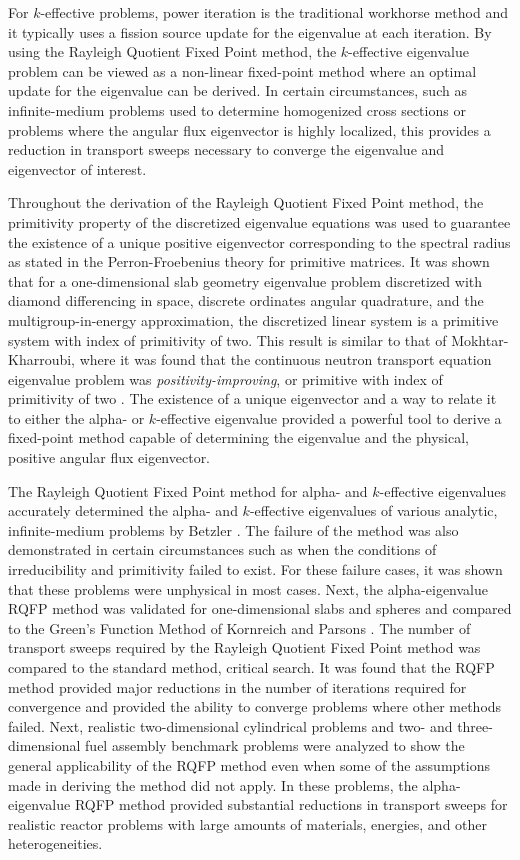 For $k$-effective problems, power iteration is the traditional workhorse method and it typically uses a fission source update for the eigenvalue at each iteration. By using the Rayleigh Quotient Fixed Point method, the $k$-effective eigenvalue problem can be viewed as a non-linear fixed-point method where an optimal update for the eigenvalue can be derived. In certain circumstances, such as infinite-medium problems used to determine homogenized cross sections or problems where the angular flux eigenvector is highly localized, this provides a reduction in transport sweeps necessary to converge the eigenvalue and eigenvector of interest.

Throughout the derivation of the Rayleigh Quotient Fixed Point method, the primitivity property of the discretized eigenvalue equations was used to guarantee the existence of a unique positive eigenvector corresponding to the spectral radius as stated in the Perron-Froebenius theory for primitive matrices. It was shown that for a one-dimensional slab geometry eigenvalue problem discretized with diamond differencing in space, discrete ordinates angular quadrature, and the multigroup-in-energy approximation, the discretized linear system is a primitive system with index of primitivity of two. This result is similar to that of Mokhtar-Kharroubi, where it was found that the continuous neutron transport equation eigenvalue problem was \textit{positivity-improving}, or primitive with index of primitivity of two \cite{mokhtar1997mathematical}. The existence of a unique eigenvector and a way to relate it to either the alpha- or $k$-effective eigenvalue provided a powerful tool to derive a fixed-point method capable of determining the eigenvalue and the physical, positive angular flux eigenvector.

The Rayleigh Quotient Fixed Point method for alpha- and $k$-effective eigenvalues accurately determined the alpha- and $k$-effective eigenvalues of various analytic, infinite-medium problems by Betzler \cite{Betzler2014Alpha}. The failure of the method was also demonstrated in certain circumstances such as when the conditions of irreducibility and primitivity failed to exist. For these failure cases, it was shown that these problems were unphysical in most cases. Next, the alpha-eigenvalue RQFP method was validated for one-dimensional slabs and spheres and compared to the Green's Function Method of Kornreich and Parsons \cite{kornreich_timeeigenvalue_2005}. The number of transport sweeps required by the Rayleigh Quotient Fixed Point method was compared to the standard method, critical search. It was found that the RQFP method provided major reductions in the number of iterations required for convergence and provided the ability to converge problems where other methods failed. Next, realistic two-dimensional cylindrical problems and two- and three-dimensional fuel assembly benchmark problems were analyzed to show the general applicability of the RQFP method  even when some of the assumptions made in deriving the method did not apply. In these problems, the alpha-eigenvalue RQFP method provided substantial reductions in transport sweeps for realistic reactor problems with large amounts of materials, energies, and other heterogeneities.

